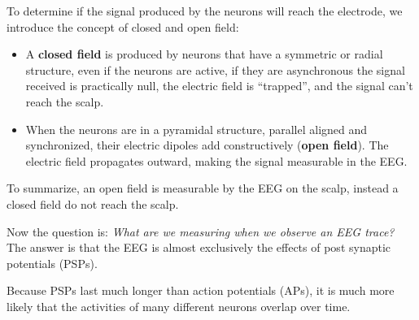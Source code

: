 \documentclass[10pt, letterpaper]{report}
\begin{document}
To determine if the signal produced by the neurons will reach the electrode, we introduce the concept of closed and open field:\begin{itemize}
     \item A \textbf{closed field} is produced by neurons that have a symmetric or radial structure, even if the neurons are active, if they are asynchronous the signal received is practically null, the electric field is ``trapped'', and the signal can't reach the scalp.
     \item When the neurons are in a pyramidal structure, parallel aligned and synchronized, their electric dipoles add constructively (\textbf{open field}). The electric field propagates outward, making the signal measurable in the EEG.
\end{itemize}
To summarize, an open field is measurable by the EEG on the scalp, instead a closed field do not reach the scalp.\bigskip 

\noindent Now the question is: \textit{What are we measuring when we observe an EEG trace?} The answer is that the EEG is almost exclusively the effects of post synaptic potentials (PSPs).

Because PSPs last much longer than action potentials (APs), it is much more likely that the activities of many different neurons overlap over time.
\end{document}
